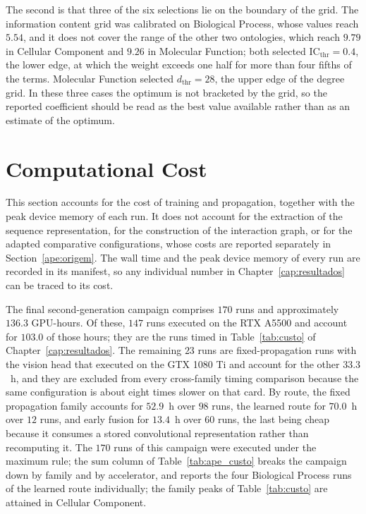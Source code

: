 \documentclass[Ingles]{ic-tese-v3}
\begin{document}
\begin{appendices}{}
The second is that three of the six selections lie on the boundary of the grid. The information
content grid was calibrated on Biological Process, whose values reach $5.54$, and it does not cover
the range of the other two ontologies, which reach $9.79$ in Cellular Component and $9.26$ in
Molecular Function; both selected $\mathrm{IC}_{\text{thr}} = 0.4$, the lower edge, at which the
weight exceeds one half for more than four fifths of the terms. Molecular Function selected
$d_{\text{thr}} = 28$, the upper edge of the degree grid. In these three cases the optimum is not
bracketed by the grid, so the reported coefficient should be read as the best value available rather
than as an estimate of the optimum.



\section{Computational Cost}
\label{ape:custo}

This section accounts for the cost of training and propagation, together with the peak device
memory of each run. It does not account for the extraction of the sequence representation, for the
construction of the interaction graph, or for the adapted comparative configurations, whose costs
are reported separately in Section~\ref{ape:origem}. The wall time and the peak device memory of
every run are recorded in its manifest, so any individual number in Chapter~\ref{cap:resultados} can
be traced to its cost.


The final second-generation campaign comprises $170$ runs and approximately $136.3$ GPU-hours.
Of these, $147$ runs executed on the RTX A5500 and account for $103.0$ of those hours; they are
the runs timed in Table~\ref{tab:custo} of Chapter~\ref{cap:resultados}. The remaining $23$ runs
are fixed-propagation runs with the vision head that executed on the GTX 1080 Ti and account for
the other $33.3$~h, and they are excluded from every cross-family timing comparison because the
same configuration is about eight times slower on that card. By route, the fixed propagation
family accounts for $52.9$~h over $98$ runs, the learned route for $70.0$~h over $12$ runs, and
early fusion for $13.4$~h over $60$ runs, the last being cheap because it consumes a stored
convolutional representation rather than recomputing it. The $170$ runs of this campaign were
executed under the maximum rule; the $\mathrm{sum}$ column of Table~\ref{tab:ape_custo} breaks the campaign down by family and by accelerator, and reports the
four Biological Process runs of the learned route individually; the family peaks of
Table~\ref{tab:custo} are attained in Cellular Component.



\end{appendices}
\end{document}
